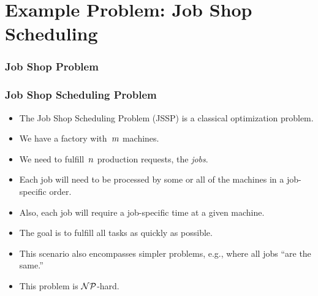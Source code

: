\documentclass[mathserif]{beamer}%
\begin{document}
\section{Example Problem: Job Shop Scheduling}%
%
\begin{frame}%
\frametitle{Job Shop Problem}%
%
%
%
%
%
%
%
%
%
%
%
%
%
\end{frame}%
%
\begin{frame}%
\frametitle{Job Shop Scheduling Problem}%
\begin{itemize}%
\item The Job Shop Scheduling Problem (JSSP)\cite{GLLRK1979OAAIDSASAS,LLRKS1993SASAAC,L1982RRITTOMS,T199BFBSP,BDP1996TJSSPCANST} is a classical optimization problem.%
\item<2-> We have a factory with~$m$ machines.%
\item<3-> We need to fulfill~$n$ production requests, the \emph{jobs}.%
\item<4-> Each job will need to be processed by some or all of the machines in a job-specific order.%
\item<5-> Also, each job will require a job-specific time at a given machine.%
\item<6-> The goal is to fulfill all tasks as quickly as possible.%
\item<7-> This scenario also encompasses simpler problems, e.g., where all jobs ``are the same.''%
\item<8-> This problem is \mbox{$\mathcal{NP}$-hard}.\cite{K1972RACP,C1971TCOTPP}%
\end{itemize}%
\end{frame}%
\end{document}
